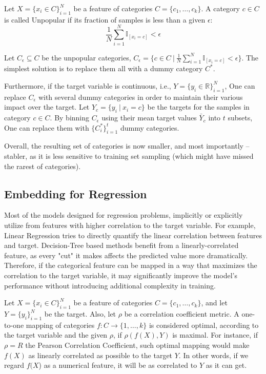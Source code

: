 \documentclass{article}
\begin{document}
Let $X=\{x_i \in C\}_{i=1}^N$ be a feature of categories $C=\{c_1,\dots,c_k\}$. A category $c\in C$ is called Unpopular if its fraction of samples is less than a given $\epsilon$: 
$$\frac1N \sum_{i=1}^{N}\mathbb{I}_{[x_i = c]} < \epsilon$$

Let $C_\epsilon \subseteq C$ be the unpopular categories, $C_\epsilon = \{c \in C\ \vert \ \frac1N \sum_{i=1}^{N}\mathbb{I}_{[x_i = c]} < \epsilon \}$. The simplest solution is to replace them all with a dummy category $C^*$. 

Furthermore, if the target variable is continuous, i.e., $Y = \{y_i \in \mathbb{R}\}_{i=1}^N$, One can replace $C_\epsilon$ with several dummy categories in order to maintain their various impact over the target. Let $Y_c = \{y_i\ \vert\ x_i = c\}$ be the targets for the samples in category $c\in C$. By binning $C_\epsilon$ using their mean target values $\bar{Y}_c$ into $t$ subsets, One can replace them with $\{C_i^*\}_{i=1}^t$ dummy categories.

Overall, the resulting set of categories is now smaller, and most importantly -- stabler, as it is less sensitive to training set sampling (which might have missed the rarest of categories).

\subsection{Embedding for Regression}
Most of the models designed for regression problems, implicitly or explicitly utilize from features with higher correlation to the target variable. For example, Linear Regression tries to directly quantify the linear correlation between features and target. Decision-Tree based methods benefit from a linearly-correlated feature, as every "cut" it makes affects the predicted value more dramatically. Therefore, if the categorical feature can be mapped in a way that maximizes the correlation to the target variable, it may significantly improve the model's performance without introducing additional complexity in training.

Let $X=\{x_i \in C\}_{i=1}^N$ be a feature of categories $C=\{c_1,\dots,c_k\}$, and let $Y=\{y_i\}_{i=1}^N$ be the target. Also, let $\rho$ be a correlation coefficient metric. 
A one-to-one mapping of categories $f: C\to\{1,\dots,k\}$ is considered optimal, according to  the target variable and the given $\rho$, if $\rho(f(X), Y)$ is maximal.
For instance, if $\rho = R$ the Pearson Correlation Coefficient, such optimal mapping would make $f(X)$ as linearly correlated as possible to the target $Y$. In other words, if we regard $f(X$) as a numerical feature, it will be as correlated to $Y$ as it can get.
\end{document}
